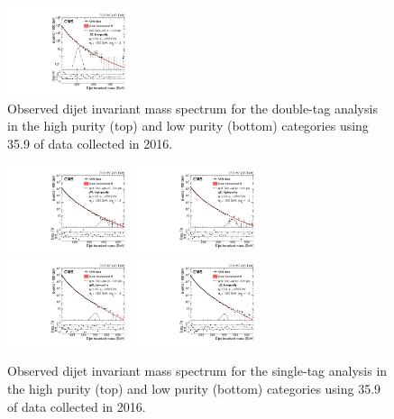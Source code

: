 \begin{figure}[h!]
\includegraphics[width=0.327\textwidth]{figures/analysis/search2/B2G-17-001/Figure_004-f.pdf}
\caption{Observed dijet invariant mass spectrum for the double-tag analysis in the high purity (top) and low purity (bottom) categories using 35.9 \fbinv of data collected in 2016.}
\label{fig:searchII:doubleobsmvv_full}
\end{figure}
\begin{figure}[h!]
\centering
\includegraphics[width=0.327\textwidth]{figures/analysis/search2/B2G-17-001/Figure_005-a.pdf}
\includegraphics[width=0.327\textwidth]{figures/analysis/search2/B2G-17-001/Figure_005-c.pdf}\\
\includegraphics[width=0.327\textwidth]{figures/analysis/search2/B2G-17-001/Figure_005-b.pdf}
\includegraphics[width=0.327\textwidth]{figures/analysis/search2/B2G-17-001/Figure_005-d.pdf}
\caption{Observed dijet invariant mass spectrum for the single-tag analysis in the high purity (top) and low purity (bottom) categories using 35.9 \fbinv of data collected in 2016.}
\label{fig:searchII:doubleobsmqv_full}
\end{figure}
